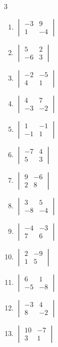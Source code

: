 \begin{multicols}{3}
\begin{enumerate}[label=\arabic*.,  leftmargin=*]
\item $\begin{vmatrix} -3 & 9 \\ 1 & -4 \end{vmatrix}$
\item $\begin{vmatrix} 5 & 2 \\ -6 & 3 \end{vmatrix}$
\item $\begin{vmatrix} -2 & -5 \\ 4 & 1 \end{vmatrix}$
\item $\begin{vmatrix} 4 & 7 \\ -3 & -2 \end{vmatrix}$
\item $\begin{vmatrix} 1 & -1 \\ -1 & 1 \end{vmatrix}$
\item $\begin{vmatrix} -7 & 4 \\ 5 & 3 \end{vmatrix}$
\item $\begin{vmatrix} 9 & -6 \\ 2 & 8 \end{vmatrix}$
\item $\begin{vmatrix} 3 & 5 \\ -8 & -4 \end{vmatrix}$
\item $\begin{vmatrix} -4 & -3 \\ 7 & 6 \end{vmatrix}$
\item $\begin{vmatrix} 2 & -9 \\ 1 & 5 \end{vmatrix}$
\item $\begin{vmatrix} 6 & 1 \\ -5 & -8 \end{vmatrix}$
\item $\begin{vmatrix} -3 & 4 \\ 8 & -2 \end{vmatrix}$
\item $\begin{vmatrix} 10 & -7 \\ 3 & 1 \end{vmatrix}$

\end{enumerate}
\end{multicols}
